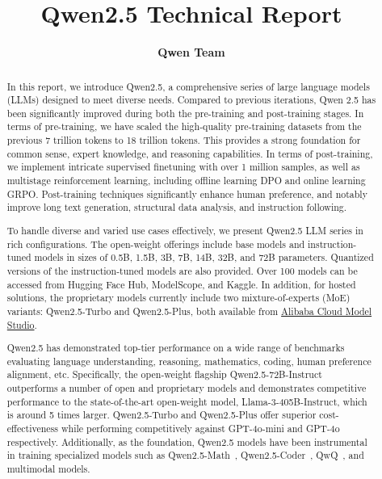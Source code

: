 \documentclass{article}
\title{Qwen2.5 Technical Report}
\author{
\bf Qwen Team
}
\begin{document}
\maketitle

\begin{abstract}

In this report, we introduce Qwen2.5, a comprehensive series of large language models (LLMs) designed to meet diverse needs. 
Compared to previous iterations, Qwen 2.5 has been significantly improved during both the pre-training and post-training stages. 
In terms of pre-training, we have scaled the high-quality pre-training datasets from the previous 7 trillion tokens to 18 trillion tokens.
This provides a strong foundation for 
common sense, expert knowledge, and reasoning capabilities.
In terms of post-training, we implement intricate supervised finetuning with over 1 million samples, as well as multistage reinforcement learning, including offline learning DPO and online learning GRPO. 
Post-training techniques significantly enhance human preference, and notably improve long text generation, structural data analysis, and instruction following.

\smallskip
To handle diverse and varied use cases effectively, 
we present Qwen2.5 LLM series in rich configurations.
The open-weight offerings include base models and instruction-tuned models in sizes of 0.5B, 1.5B, 3B, 7B, 14B, 32B, and 72B parameters. Quantized versions of the instruction-tuned models are also provided. Over 100 models can be accessed from Hugging Face Hub, ModelScope, and Kaggle.
In addition, for hosted solutions, the proprietary models currently include two mixture-of-experts (MoE) variants: Qwen2.5-Turbo and Qwen2.5-Plus, both available from \href{https://www.alibabacloud.com/en/product/modelstudio}{Alibaba Cloud Model Studio}.

Qwen2.5 has demonstrated top-tier performance on a wide range of benchmarks evaluating language understanding, reasoning, mathematics, coding, human preference alignment, etc. Specifically, the open-weight flagship Qwen2.5-72B-Instruct outperforms a number of open and proprietary models and demonstrates competitive performance to the state-of-the-art open-weight model, Llama-3-405B-Instruct, which is around 5 times larger.
Qwen2.5-Turbo and Qwen2.5-Plus offer superior cost-effectiveness while performing competitively against GPT-4o-mini and GPT-4o respectively.
Additionally, as the foundation, Qwen2.5 models have been instrumental in training specialized models such as Qwen2.5-Math~\citep{qwen2.5math}, Qwen2.5-Coder~\citep{qwen2.5coder}, QwQ~\citep{qwq}, and multimodal models.

\end{abstract}
\end{document}
